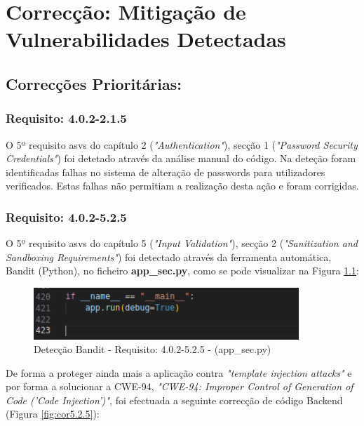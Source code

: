 %
%
\chapter{Correcção: Mitigação de Vulnerabilidades Detectadas}
\label{chap.Correcao}


\section{Correcções Prioritárias:}

\subsection*{Requisito: 4.0.2-2.1.5}
O 5º requisito \ac{asvs} do capítulo 2 (\textit{"Authentication"}), secção 1  (\textit{"Password Security Credentials"}) foi detetado através da análise manual do código.
Na deteção foram identificadas falhas no sistema de alteração de passwords para utilizadores verificados. Estas falhas não permitiam a realização desta ação e foram corrigidas.  

\subsection*{Requisito: 4.0.2-5.2.5}

O 5º requisito \ac{asvs} do capítulo 5 (\textit{"Input Validation"}), secção 2  (\textit{"Sanitization and Sandboxing Requirements"}) foi detectado através da ferramenta automática, Bandit (Python), no ficheiro \textbf{app\_sec.py}, como se pode visualizar na Figura \ref{fig:det5.2.5}:

\begin{figure}[H]
      \centering
      \includegraphics[width=10cm]{images/detdebug.png}
      \caption{Detecção Bandit - Requisito: 4.0.2-5.2.5 - (app\_sec.py)}
      \label{fig:det5.2.5}
\end{figure}

De forma a proteger ainda mais a aplicação contra \textit{"template injection attacks"} e por forma a solucionar a CWE-94, \textit{"CWE-94: Improper Control of Generation of Code ('Code Injection')"}, foi efectuada a seguinte correcção de código Backend (Figura \ref{fig:cor5.2.5}):

